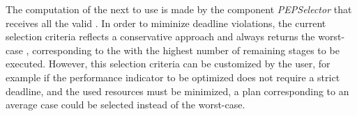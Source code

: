 The computation of the next \plan to use is made by the component \textit{PEPSelector} that receives all the valid \plans. In order to miminize deadline violations, the current selection criteria reflects a conservative approach and always returns the worst-case \plan, corresponding to the \plan with the highest number of remaining stages to be executed. However, this selection criteria can be customized by the user, for example if the performance indicator to be optimized does not require a strict deadline, and the used resources must be minimized, a plan corresponding to an average case could be selected instead of the worst-case. 



